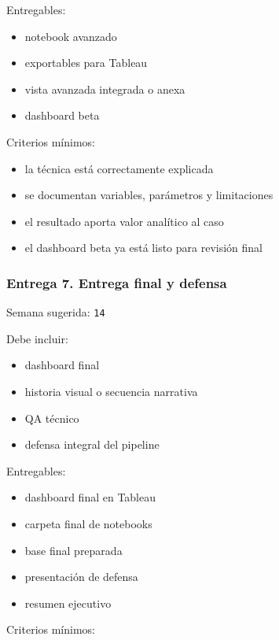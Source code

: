\documentclass[
]{article}
\providecommand{\tightlist}{%
  \setlength{\itemsep}{0pt}\setlength{\parskip}{0pt}}
\begin{document}
Entregables:

\begin{itemize}
\tightlist
\item
  notebook avanzado
\item
  exportables para Tableau
\item
  vista avanzada integrada o anexa
\item
  dashboard beta
\end{itemize}

Criterios mínimos:

\begin{itemize}
\tightlist
\item
  la técnica está correctamente explicada
\item
  se documentan variables, parámetros y limitaciones
\item
  el resultado aporta valor analítico al caso
\item
  el dashboard beta ya está listo para revisión final
\end{itemize}

\subsubsection{Entrega 7. Entrega final y
defensa}\label{entrega-7-entrega-final-y-defensa}

Semana sugerida: \texttt{14}

Debe incluir:

\begin{itemize}
\tightlist
\item
  dashboard final
\item
  historia visual o secuencia narrativa
\item
  QA técnico
\item
  defensa integral del pipeline
\end{itemize}

Entregables:

\begin{itemize}
\tightlist
\item
  dashboard final en Tableau
\item
  carpeta final de notebooks
\item
  base final preparada
\item
  presentación de defensa
\item
  resumen ejecutivo
\end{itemize}

Criterios mínimos:
\end{document}
